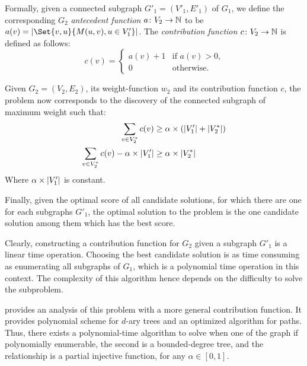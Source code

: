 			Formally, given a connected subgraph $G'_1=(V'_1,E'_1)$ of $G_1$, we define the corresponding $G_2$ \emph{antecedent function} $a\colon V_2 \to \mathbb{N}$ to be $a(v)=\card{\Set{v,u}{M(u,v), u\in V'_1}}$.
			The \emph{contribution function} $c\colon V_2 \to \mathbb{N}$ is defined as follows:
			$$c(v)=\begin{cases}a(v) + 1 &\mbox{if }a(v) > 0\mbox{,} \\
		                       0        &\mbox{otherwise.}
		          \end{cases}$$

			Given $G_2=(V_2,E_2)$, its weight-function $w_2$ and its contribution function $c$, the problem now corresponds to the discovery of the connected subgraph of maximum weight such that:
			\begin{align*}
				\sum_{v \in V^*_2}{c(v)}                           &\geq \alpha\times\left(\norm{V'_1} + \norm{V^*_2}\right) \\
				\sum_{v \in V^*_2}{c(v)} - \alpha\times\norm{V'_1} &\geq \alpha\times\norm{V^*_2}
			\end{align*}
			Where $\alpha\times\lvert V_1'\rvert$ is constant.

			Finally, given the optimal score of all candidate solutions, for which there are one for each subgraphs $G'_1$, the optimal solution to the \mwccs{} problem is the one candidate solution among them which has the best score.

			Clearly, constructing a contribution function for $G_2$ given a subgraph $G'_1$ is a linear time operation.
			Choosing the best candidate solution is as time consuming as enumerating all subgraphs of $G_1$, which is a polynomial time operation in this context.
			The complexity of this algorithm hence depends on the difficulty to solve the \rbmwcs{} subproblem.

			 provides an analysis of this problem with a more general contribution function.
			It provides polynomial scheme for $d$-ary trees and an optimized algorithm for paths.
			Thus, there exists a polynomial-time algorithm to solve \mwccs{} when one of the graph if polynomially enumerable, the second is a bounded-degree tree, and the relationship is a partial injective function, for any $\alpha \in [0, 1]$.

